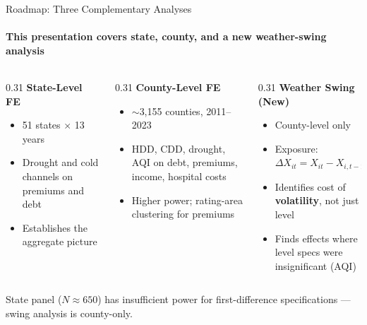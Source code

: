\documentclass[aspectratio=169,11pt]{beamer}
\newcommand{\emphcolor}[1]{{\color{WarmOrange}\textbf{#1}}}
\newcommand{\tealtext}[1]{{\color{Teal}#1}}
\newcommand{\graytext}[1]{{\color{WarmGray}#1}}
\begin{document}
\begin{frame}{Roadmap: Three Complementary Analyses}
  \framesubtitle{This presentation covers state, county, and a new weather-swing analysis}
  \begin{columns}[T]
    \begin{column}{0.31\textwidth}
      \textbf{\tealtext{State-Level FE}}\\[0.2em]
      \footnotesize
      \begin{itemize}\itemsep0.12em
        \item 51 states $\times$ 13 years
        \item Drought and cold channels on premiums and debt
        \item Establishes the aggregate picture
      \end{itemize}
    \end{column}
    \begin{column}{0.31\textwidth}
      \textbf{\tealtext{County-Level FE}}\\[0.2em]
      \footnotesize
      \begin{itemize}\itemsep0.12em
        \item $\sim$3,155 counties, 2011--2023
        \item HDD, CDD, drought, AQI on debt, premiums, income, hospital costs
        \item Higher power; rating-area clustering for premiums
      \end{itemize}
    \end{column}
    \begin{column}{0.31\textwidth}
      \textbf{\emphcolor{Weather Swing (New)}}\\[0.2em]
      \footnotesize
      \begin{itemize}\itemsep0.12em
        \item County-level only
        \item Exposure: $\Delta X_{it} = X_{it} - X_{i,t-1}$
        \item Identifies cost of \emphcolor{volatility}, not just level
        \item Finds effects where level specs were insignificant (AQI)
      \end{itemize}
    \end{column}
  \end{columns}
  \vspace{0.4em}
  \begin{center}
    \graytext{\scriptsize State panel ($N{\approx}650$) has insufficient power for first-difference specifications --- swing analysis is county-only.}
  \end{center}
\end{frame}
\end{document}
